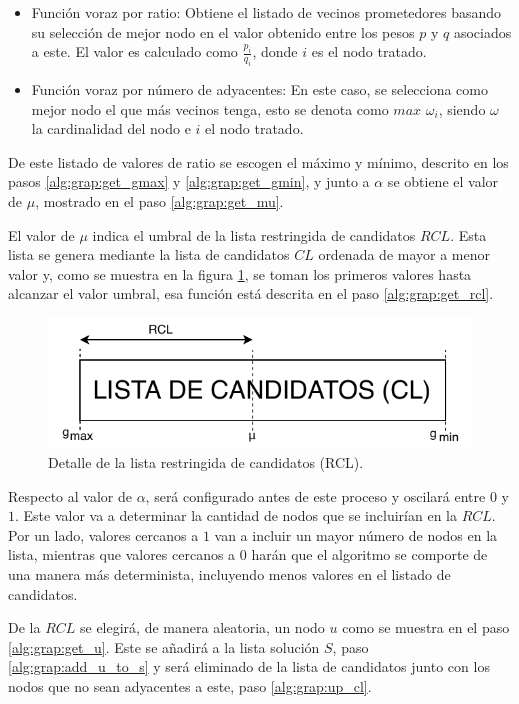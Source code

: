 \begin{itemize}
	\item Función voraz por ratio: Obtiene el listado de vecinos prometedores basando su selección de mejor nodo en el valor obtenido entre los pesos $p$ y $q$ asociados a este. El valor es calculado como $\frac{p_i}{q_i}$, donde $i$ es el nodo tratado.
	\item Función voraz por número de adyacentes: En este caso, se selecciona como mejor nodo el que más vecinos tenga, esto se denota como $max$ $\omega_i$, siendo $\omega$ la cardinalidad del nodo e $i$ el nodo tratado.
\end{itemize}

De este listado de valores de ratio se escogen el máximo y mínimo, descrito en los pasos \ref{alg:grap:get_gmax} y \ref{alg:grap:get_gmin}, y junto a $\alpha$ se obtiene el valor de $\mu$, mostrado en el paso \ref{alg:grap:get_mu}.

El valor de $\mu$ indica el umbral de la lista restringida de candidatos $RCL$. Esta lista se genera mediante la lista de candidatos $CL$ ordenada de mayor a menor valor y, como se muestra en la figura \ref{fig:rcl}, se toman los primeros valores hasta alcanzar el valor umbral, esa función está descrita  en el paso \ref{alg:grap:get_rcl}.

 \begin{figure}[H]
	\centering
	\includegraphics{Figures/rcl.pdf}
	\caption{Detalle de la lista restringida de candidatos (RCL).}
	\label{fig:rcl}
\end{figure}

Respecto al valor de $\alpha$, será configurado antes de este proceso y oscilará entre $0$ y $1$. Este valor va a determinar la cantidad de nodos que se incluirían en la $RCL$. Por un lado, valores cercanos a $1$ van a incluir un mayor número de nodos en la lista, mientras que valores cercanos a $0$ harán que el algoritmo se comporte de una manera más determinista, incluyendo menos valores en el listado de candidatos.

De la $RCL$ se elegirá, de manera aleatoria, un nodo $u$ como se muestra en el paso \ref{alg:grap:get_u}. Este se añadirá a la lista solución $S$, paso \ref{alg:grap:add_u_to_s} y será eliminado de la lista de candidatos junto con los nodos que no sean adyacentes a este, paso \ref{alg:grap:up_cl}.

